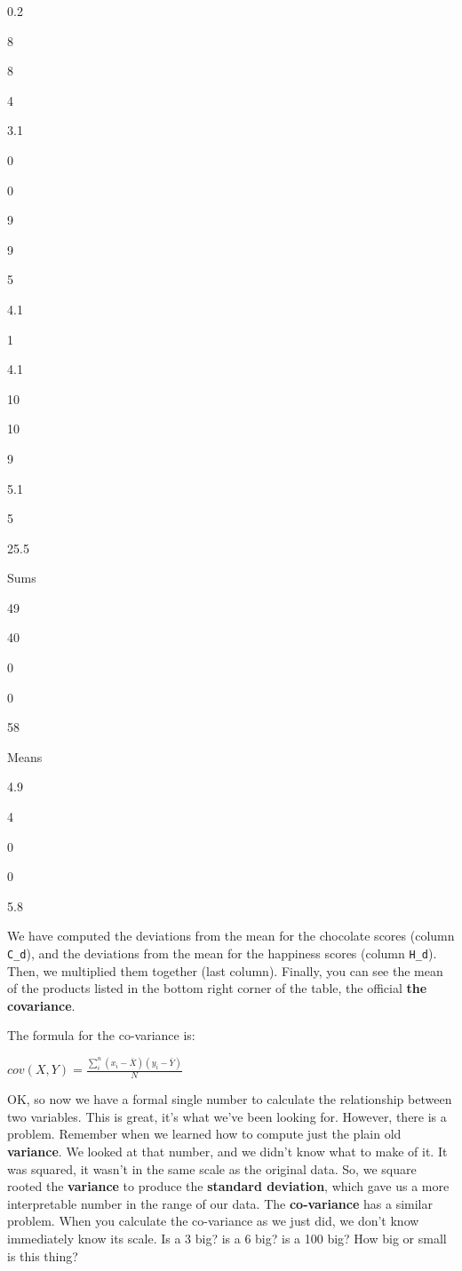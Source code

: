\documentclass[
]{book}
\begin{document}
0.2

8

8

4

3.1

0

0

9

9

5

4.1

1

4.1

10

10

9

5.1

5

25.5

Sums

49

40

0

0

58

Means

4.9

4

0

0

5.8

We have computed the deviations from the mean for the chocolate scores (column \texttt{C\_d}), and the deviations from the mean for the happiness scores (column \texttt{H\_d}). Then, we multiplied them together (last column). Finally, you can see the mean of the products listed in the bottom right corner of the table, the official \textbf{the covariance}.

The formula for the co-variance is:

\(cov(X,Y) = \frac{\sum_{i}^{n}(x_{i}-\bar{X})(y_{i}-\bar{Y})}{N}\)

OK, so now we have a formal single number to calculate the relationship between two variables. This is great, it's what we've been looking for. However, there is a problem. Remember when we learned how to compute just the plain old \textbf{variance}. We looked at that number, and we didn't know what to make of it. It was squared, it wasn't in the same scale as the original data. So, we square rooted the \textbf{variance} to produce the \textbf{standard deviation}, which gave us a more interpretable number in the range of our data. The \textbf{co-variance} has a similar problem. When you calculate the co-variance as we just did, we don't know immediately know its scale. Is a 3 big? is a 6 big? is a 100 big? How big or small is this thing?
\end{document}
